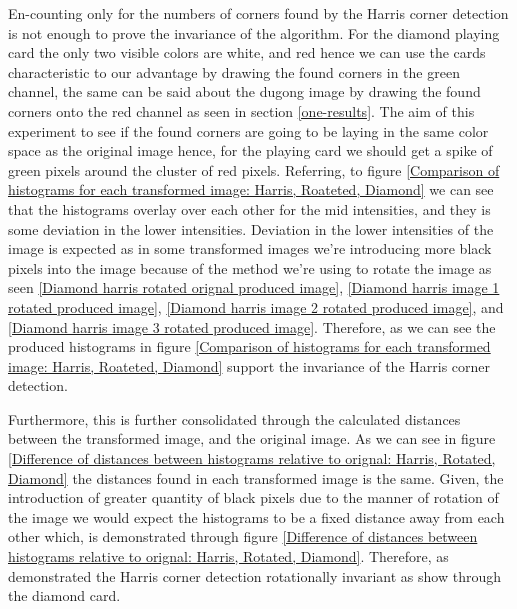 \documentclass[conference]{IEEEtran}
\begin{document}
En-counting only for the numbers of corners found by the Harris corner detection is not enough to prove the invariance of the algorithm. For the diamond playing card the only two visible colors are white, and red hence we can use the cards characteristic to our advantage by drawing the found corners in the green channel, the same can be said about the dugong image by drawing the found corners onto the red channel as seen in section \ref{one-results}. The aim of this experiment to see if the found corners are going to be laying in the same color space as the original image hence, for the playing card we should get a spike of green pixels around the cluster of red pixels. Referring, to figure \ref{Comparison of histograms for each transformed image: Harris, Roateted, Diamond} we can see that the histograms overlay over each other for the mid intensities, and they is some deviation in the lower intensities. Deviation in the lower intensities of the image is expected as in some transformed images we're introducing more black pixels into the image because of the method we're using to rotate the image as seen \ref{Diamond harris rotated orignal produced image}, \ref{Diamond harris image 1 rotated produced image}, \ref{Diamond harris image 2 rotated produced image}, and \ref{Diamond harris image 3 rotated produced image}. Therefore, as we can see the produced histograms in figure \ref{Comparison of histograms for each transformed image: Harris, Roateted, Diamond} support the invariance of the Harris corner detection.\par

Furthermore, this is further consolidated through the calculated distances between the transformed image, and the original image. As we can see in figure \ref{Difference of distances between histograms relative to orignal: Harris, Rotated, Diamond} the distances found in each transformed image is the same. Given, the introduction of greater quantity of black pixels due to the manner of rotation of the image we would expect the histograms to be a fixed distance away from each other which, is demonstrated through figure \ref{Difference of distances between histograms relative to orignal: Harris, Rotated, Diamond}. Therefore, as demonstrated the Harris corner detection rotationally invariant as show through the diamond card.
\end{document}

